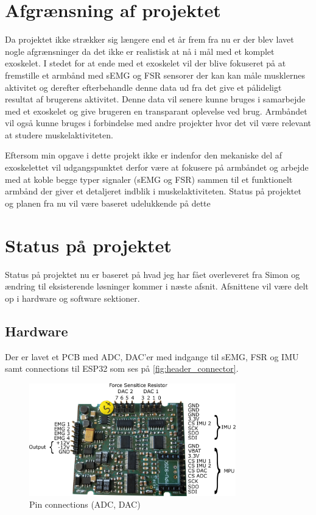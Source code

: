 \section{Afgrænsning af projektet}
Da projektet ikke strækker sig længere end et år frem fra nu er der blev lavet nogle afgrænsninger da det ikke er realistisk at nå i mål med et komplet exoskelet. I stedet for at ende med et exoskelet vil der blive fokuseret på at fremstille et armbånd med sEMG og FSR sensorer der kan kan måle musklernes aktivitet og derefter efterbehandle denne data ud fra det give et pålideligt resultat af brugerens aktivitet. Denne data vil senere kunne bruges i samarbejde med et exoskelet og give brugeren en transparant oplevelse ved brug. Armbåndet vil også kunne bruges i forbindelse med andre projekter hvor det vil være relevant at studere muskelaktiviteten.

Eftersom min opgave i dette projekt ikke er indenfor den mekaniske del af exoskelettet vil udgangspunktet derfor være at fokusere på armbåndet og arbejde med at koble begge typer signaler (sEMG og FSR) sammen til et funktionelt armbånd der giver et detaljeret indblik i muskelaktiviteten. Status på projektet og planen fra nu vil være baseret udelukkende på dette

\section{Status på projektet}
Status på projektet nu er baseret på hvad jeg har fået overleveret fra Simon og ændring til eksisterende løsninger kommer i næste afsnit. Afsnittene vil være delt op i hardware og software sektioner.

\subsection{Hardware}

Der er lavet et PCB med ADC, DAC'er med indgange til sEMG, FSR og IMU samt connections til ESP32 som ses på \autoref{fig:header_connector}.

\begin{figure}[htbp]
	\centering
	\includegraphics[width=0.8\textwidth]{figures/Pin_header_connector}
	\caption{Pin connections (ADC, DAC)}
	\label{fig:header_connector}
\end{figure}

